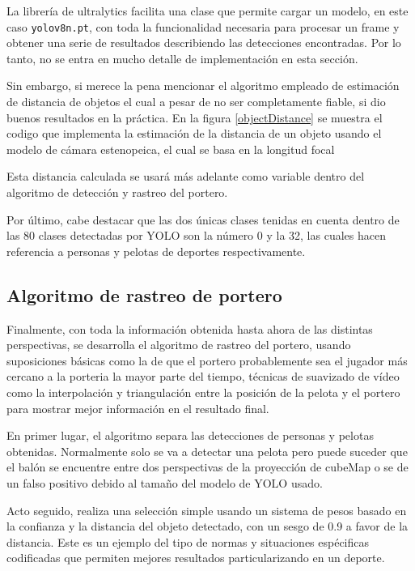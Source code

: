 La librería de ultralytics facilita una clase que permite cargar un modelo, en este caso \verb|yolov8n.pt|, con toda la funcionalidad necesaria para procesar un frame y obtener una serie de resultados describiendo las detecciones encontradas. Por lo tanto, no se entra en mucho detalle de implementación en esta sección.

Sin embargo, si merece la pena mencionar el algoritmo empleado de estimación de distancia de objetos el cual a pesar de no ser completamente fiable, si dio buenos resultados en la práctica. En la figura \ref{objectDistance} se muestra el codigo que implementa la estimación de la distancia de un objeto usando el modelo de cámara estenopeica, el cual se basa en la longitud focal


Esta distancia calculada se usará más adelante como variable dentro del algoritmo de detección y rastreo del portero.

Por último, cabe destacar que las dos únicas clases tenidas en cuenta dentro de las 80 clases detectadas por YOLO son la número 0 y la 32, las cuales hacen referencia a personas y pelotas de deportes respectivamente.

\subsection{Algoritmo de rastreo de portero}
Finalmente, con toda la información obtenida hasta ahora de las distintas perspectivas, se desarrolla el algoritmo de rastreo del portero, usando suposiciones básicas como la de que el portero probablemente sea el jugador más cercano a la porteria la mayor parte del tiempo, técnicas de suavizado de vídeo como la interpolación y triangulación entre la posición de la pelota y el portero para mostrar mejor información en el resultado final.

En primer lugar, el algoritmo separa las detecciones de personas y pelotas obtenidas. Normalmente solo se va a detectar una pelota pero puede suceder que el balón se encuentre entre dos perspectivas de la proyección de cubeMap o se de un falso positivo debido al tamaño del modelo de YOLO usado. 

Acto seguido, realiza una selección simple usando un sistema de pesos basado en la confianza y la distancia del objeto detectado, con un sesgo de 0.9 a favor de la distancia. Este es un ejemplo del tipo de normas y situaciones espécificas codificadas que permiten mejores resultados particularizando en un deporte.

